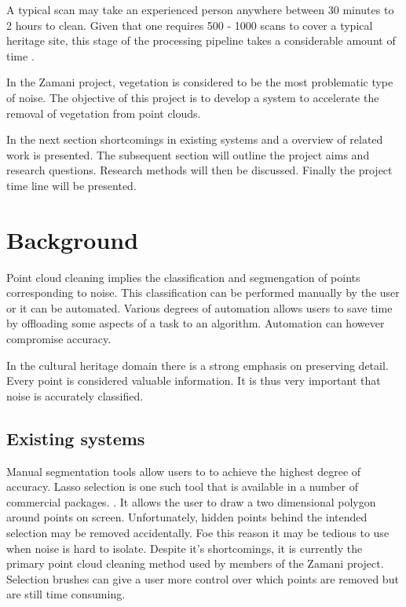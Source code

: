 \documentclass[10pt,twocolumn]{article}
\begin{document}
A typical scan may take an experienced person anywhere between 30 minutes to 2 hours to clean. Given that one requires 500 - 1000 scans to cover a typical heritage site, this stage of the processing pipeline takes a considerable amount of time \cite{Ruther2011}.

In the Zamani project, vegetation is considered to be the most problematic type of noise. The objective of this project is to develop a system to accelerate the removal of vegetation from point clouds.

In the next section shortcomings in existing systems and a overview of related work is presented. The subsequent section will outline the project aims and research questions. Research methods will then be discussed. Finally the project time line will be presented.

\section{Background}

Point cloud cleaning implies the classification and segmengation of points corresponding to noise. This classification can be performed manually by the user or it can be automated. Various degrees of automation allows users to save time by offloading some aspects of a task to an algorithm. Automation can however compromise accuracy.

In the cultural heritage domain there is a strong emphasis on preserving detail. Every point is considered valuable information. It is thus very important that noise is accurately classified.

\subsection{Existing systems}
Manual segmentation tools allow users to to achieve the highest degree of accuracy. Lasso selection is one such tool that is available in a number of commercial packages. \cite{Pointools2012,Leica2012,Technodigit2012}. It allows the user to draw a two dimensional polygon around points on screen. Unfortunately, hidden points behind the intended selection may be removed accidentally. Foe this reason it may be tedious to use when noise is hard to isolate. Despite it's shortcomings, it is currently the primary point cloud cleaning method used by members of the Zamani project. Selection brushes can give a user more control over which points are removed \cite{Pointools2012} but are still time consuming.
\end{document}
